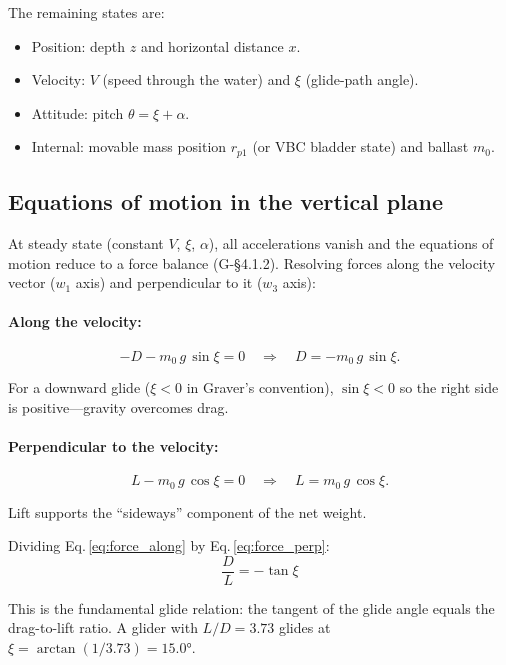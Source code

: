 \documentclass[11pt,a4paper]{article}
\begin{document}
The remaining states are:
\begin{itemize}[nosep]
  \item Position: depth $z$ and horizontal distance $x$.
  \item Velocity: $V$ (speed through the water) and $\xi$ (glide-path angle).
  \item Attitude: pitch $\theta=\xi+\alpha$.
  \item Internal: movable mass position $r_{p1}$ (or VBC bladder state) and ballast $m_0$.
\end{itemize}

\subsection{Equations of motion in the vertical plane}

At steady state (constant $V$, $\xi$, $\alpha$), all accelerations vanish and the
equations of motion reduce to a force balance (G-\S4.1.2).  Resolving forces along
the velocity vector ($w_1$ axis) and perpendicular to it ($w_3$ axis):

\paragraph{Along the velocity:}
\begin{equation}
  -D - m_0\,g\,\sin\xi = 0
  \quad\Rightarrow\quad
  D = -m_0\,g\,\sin\xi.
  \label{eq:force_along}
\end{equation}

For a downward glide ($\xi<0$ in Graver's convention), $\sin\xi<0$ so the right side
is positive---gravity overcomes drag.

\paragraph{Perpendicular to the velocity:}
\begin{equation}
  L - m_0\,g\,\cos\xi = 0
  \quad\Rightarrow\quad
  L = m_0\,g\,\cos\xi.
  \label{eq:force_perp}
\end{equation}

Lift supports the ``sideways'' component of the net weight.

Dividing Eq.\,\eqref{eq:force_along} by Eq.\,\eqref{eq:force_perp}:
\begin{equation}
  \boxed{\frac{D}{L} = -\tan\xi}
  \label{eq:DoverL}
\end{equation}

This is the fundamental glide relation: the tangent of the glide angle equals the
drag-to-lift ratio.  A glider with $L/D=3.73$ glides at
$\xi=\arctan(1/3.73)=15.0°$.
\end{document}
